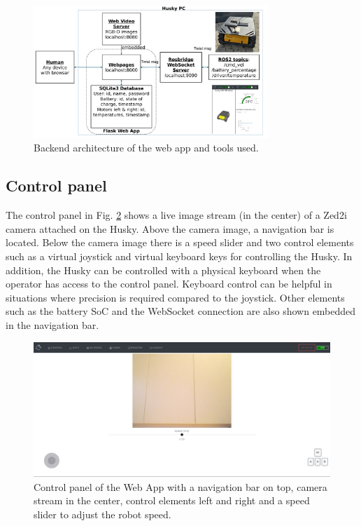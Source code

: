 \documentclass[letterpaper, 10 pt, conference]{ieeeconf}  %
\begin{document}
\begin{figure}[b]
    \centerline{\includegraphics[width=8.9cm]{images/ROS_Web_App_Architecture.pdf}}
    \caption{Backend architecture of the web app and tools used.}
    \label{fig:userapp}
\end{figure}

\subsection{Control panel}
The control panel in Fig. \ref{fig:controlpanel} shows a live image stream (in the center) of a Zed2i camera attached on the Husky. Above the camera image, a navigation bar is located. 
Below the camera image there is a speed slider and two control elements such as a virtual joystick and virtual keyboard keys for controlling the Husky. 
In addition, the Husky can be controlled with a physical keyboard when the operator has access to the control panel. Keyboard control can be helpful in situations where precision is required compared to the joystick.
Other elements such as the battery SoC and the WebSocket connection are also shown embedded in the navigation bar.
\begin{figure}[t]
    \centerline{\includegraphics[width=0.98\columnwidth]{images/control_panel.png}}
    \caption{Control panel of the Web App with a navigation bar on top, camera stream in the center, control elements left and right and a speed slider to adjust the robot speed.}
    \label{fig:controlpanel}
\end{figure}
\end{document}
